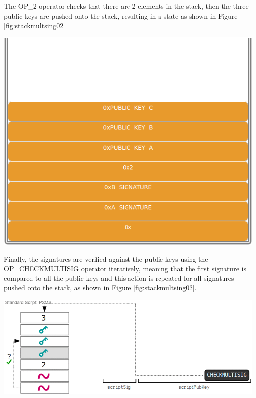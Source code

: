 \begin{example}
    The OP\_2 operator checks that there are 2 elements in the stack, then the three 
    public keys are pushed onto the stack, resulting in a state as shown in Figure \ref{fig:stackmultsing02}

    {\centering
    \vspace{15pt}
    \includegraphics[scale=0.35]{imgs/script/multisig/2.png}
    \vspace{10pt}
    \par}
   
    Finally, the signatures are verified against the public keys using the 
    OP\_CHECKMULTISIG operator iteratively, meaning that  the first signature is compared to 
    all the public keys and this action is repeated for all signatures pushed onto the stack, 
    as shown in Figure \ref{fig:stackmultsing03}.
 
    {\centering
    \vspace{15pt}
    \includegraphics[scale=0.30]{imgs/script/multisig/3.png}
    \vspace{10pt}
    \par}

\end{example}


